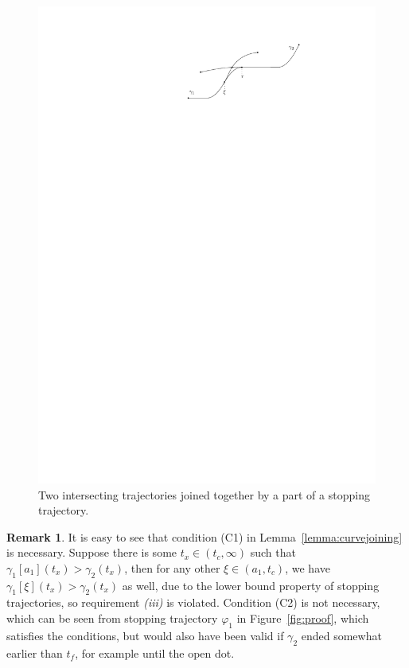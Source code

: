 \documentclass[a4paper]{article}
\theoremstyle{definition}
\newtheorem{remark}{Remark}
\theoremstyle{plain}
\begin{document}
\begin{figure}
  \centering
  \includegraphics[scale=1]{figures/motion/rough/curvejoining}
  \caption{Two intersecting trajectories joined together by a part of a stopping
    trajectory.}%
  \label{fig:curvejoining}
\end{figure}

\begin{remark}\label{rem:conditions}
  It is easy to see that condition (C1) in Lemma~\ref{lemma:curvejoining} is necessary. Suppose there
  is some $t_{x} \in (t_{c}, \infty)$ such that
  $\gamma_{1}[a_{1}](t_{x}) > \gamma_{2}(t_{x})$, then for any other
  $\xi \in (a_{1}, t_{c})$, we have $\gamma_{1}[\xi](t_{x}) > \gamma_{2}(t_{x})$
  as well, due to the lower bound property of stopping trajectories, so
  requirement \textit{(iii)} is violated.
  Condition (C2) is not necessary, which can be seen from stopping trajectory
  $\varphi_{1}$ in Figure~\ref{fig:proof}, which satisfies the conditions, but
  would also have been valid if $\gamma_{2}$ ended somewhat earlier than
  $t_{f}$, for example until the open dot.
\end{remark}
\end{document}
